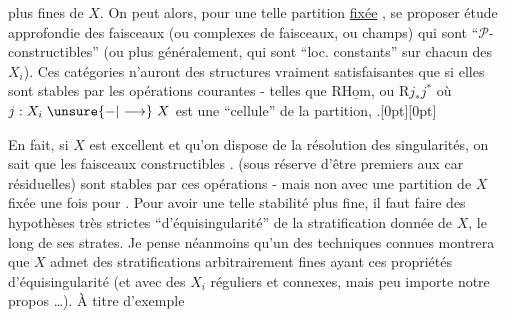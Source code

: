 plus fines de $X$. On peut alors, pour une telle partition \uline{fixée} , se proposer  étude approfondie  des faisceaux (ou complexes de faisceaux, ou champs) qui sont ``$\mathcal P$-constructibles'' (ou plus généralement, qui sont ``loc. constants'' sur chacun des $X_i$). Ces catégories n'auront des structures vraiment  satisfaisantes que si elles sont stables par les opérations courantes - telles que $\mathrm R\underline{\mathrm{Hom}}$, ou $\mathrm Rj_*j^*$ où $j:X_i\mathrel{\unsure{-|\longrightarrow}}X$ est une ``cellule'' de la partition, .\raisebox{0.35ex}[0pt][0pt]{\parbox[c][0pt][c]{0pt}{}} En fait, si $X$ est excellent et qu'on dispose de la résolution des singularités, on sait que les faisceaux  constructibles . (sous réserve d'être premiers aux car résiduelles) sont stables par  ces opérations - mais non avec une partition de $X$ fixée une fois pour . Pour avoir une telle stabilité plus fine, il faut faire des hypothèses très strictes  ``d'équisingularité'' de la stratification donnée de $X$, le long de ses strates. Je pense néanmoins qu'un  des techniques connues montrera que $X$ admet des stratifications arbitrairement fines ayant ces propriétés d'équisingularité (et avec des $X_i$ réguliers et connexes, mais peu importe  notre propos \ldots). À titre d'exemple
